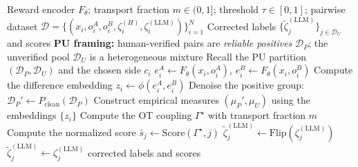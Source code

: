 \documentclass{article}
\begin{document}
\begin{algorithm}[!h]
\renewcommand{\algorithmicrequire}{\textbf{Input:}} %
\renewcommand{\algorithmicensure}{\textbf{Output:}} %
	\caption{PUAudit (auditing LLM-as-a-judge via PU learning and partial OT)} %
	\begin{algorithmic}[1] %
	    \REQUIRE
	    Reward encoder $F_{\theta}$; transport fraction $m\in(0,1]$; threshold $\tau\in[0,1]$;
	    pairwise dataset
	    $\mathcal{D}=\{(x_{i},o_{i}^{A},o_{i}^{B},\zeta_{i}^{(H)},\zeta_{i}^{(\mathrm{LLM})})\}_{i=1}^{N}$
	    \ENSURE
	    Corrected labels $\{\tilde{\zeta}_{j}^{(\mathrm{LLM})}\}_{j\in\mathcal{D}_{U}}$ and scores
	    \STATE \textbf{PU framing:} human-verified pairs are \emph{reliable positives}
	    $\mathcal{D}_{P}$; the unverified pool $\mathcal{D}_{U}$ is a heterogeneous mixture %
	    \STATE Recall the PU partition $(\mathcal{D}_{P},\mathcal{D}_{U})$ and the chosen side $c_{i}$
	    \STATE $e_{i}^{A}\leftarrow F_{\theta}(x_{i},o_{i}^{A})$,\quad
	    $e_{i}^{B}\leftarrow F_{\theta}(x_{i},o_{i}^{B})$
	    \STATE Compute the difference embedding $z_{i}\leftarrow \phi(e_{i}^{A},e_{i}^{B})$ %
	    \ENDFOR
	    \STATE Denoise the positive group: $\mathcal{D}_{P}'\leftarrow P_{\mathrm{clean}}(\mathcal{D}_{P})$
	    \STATE Construct empirical measures $(\mu_{P}',\mu_{U})$ using the embeddings $\{z_{i}\}$
	    \STATE Compute the OT coupling $\Gamma^{\star}$ with transport fraction $m$ %
	    \STATE Compute the normalized score $\bar{s}_{j}\leftarrow \mathrm{Score}(\Gamma^{\star},j)$
	    \ENDFOR
	    \STATE $\tilde{\zeta}_{j}^{(\mathrm{LLM})}\leftarrow \mathrm{Flip}(\zeta_{j}^{(\mathrm{LLM})})$ %
	    \ELSE
	    \STATE $\tilde{\zeta}_{j}^{(\mathrm{LLM})}\leftarrow \zeta_{j}^{(\mathrm{LLM})}$
	    \ENDIF
	    \ENDFOR
		\RETURN corrected labels and scores
	\end{algorithmic}
\end{algorithm}
\end{document}

